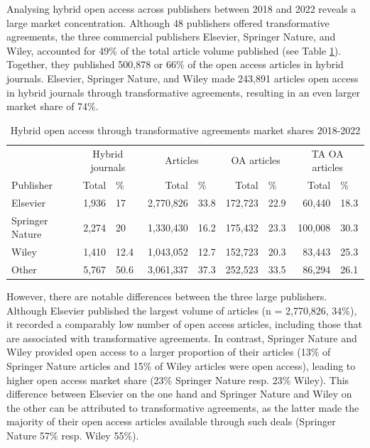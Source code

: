 \documentclass[a4paper,man,floatsintext,longtable,noextraspace,12pt]{apa6}
\begin{document}
Analysing hybrid open access across publishers between 2018 and 2022
reveals a large market concentration. Although 48 publishers offered
transformative agreements, the three commercial publishers Elsevier,
Springer Nature, and Wiley, accounted for 49\% of the total article
volume published (see Table \ref{tab:publisher_league_table}). Together,
they published 500,878 or 66\% of the open access articles in hybrid
journals. Elsevier, Springer Nature, and Wiley made 243,891 articles
open access in hybrid journals through transformative agreements,
resulting in an even larger market share of 74\%.

\begin{table}[H]

\caption{\label{tab:publisher_league_table}Hybrid open access through transformative agreements market shares 2018-2022}
\centering
\begin{tabular}[t]{lrlrlrlrl}
\toprule
\multicolumn{1}{c}{ } & \multicolumn{2}{c}{Hybrid journals} & \multicolumn{2}{c}{Articles} & \multicolumn{2}{c}{OA articles} & \multicolumn{2}{c}{TA OA articles} \\
\cmidrule(l{3pt}r{3pt}){2-3} \cmidrule(l{3pt}r{3pt}){4-5} \cmidrule(l{3pt}r{3pt}){6-7} \cmidrule(l{3pt}r{3pt}){8-9}
Publisher & Total & \% & Total & \% & Total & \% & Total & \%\\
\midrule
Elsevier & 1,936 & 17 & 2,770,826 & 33.8 & 172,723 & 22.9 & 60,440 & 18.3\\
Springer Nature & 2,274 & 20 & 1,330,430 & 16.2 & 175,432 & 23.3 & 100,008 & 30.3\\
Wiley & 1,410 & 12.4 & 1,043,052 & 12.7 & 152,723 & 20.3 & 83,443 & 25.3\\
Other & 5,767 & 50.6 & 3,061,337 & 37.3 & 252,523 & 33.5 & 86,294 & 26.1\\
\bottomrule
\end{tabular}
\end{table}

However, there are notable differences between the three large
publishers. Although Elsevier published the largest volume of articles
(n = 2,770,826, 34\%), it recorded a comparably low number of open
access articles, including those that are associated with transformative
agreements. In contrast, Springer Nature and Wiley provided open access
to a larger proportion of their articles (13\% of Springer Nature
articles and 15\% of Wiley articles were open access), leading to higher
open access market share (23\% Springer Nature resp. 23\% Wiley). This
difference between Elsevier on the one hand and Springer Nature and
Wiley on the other can be attributed to transformative agreements, as
the latter made the majority of their open access articles available
through such deals (Springer Nature 57\% resp. Wiley 55\%).
\end{document}
